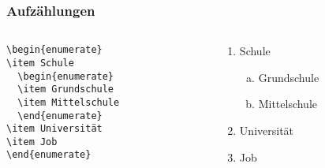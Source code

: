 \begin{frame}[fragile]
  \frametitle{Aufzählungen}

  \begin{Beispiel}
    \begin{columns}
      \begin{column}{0.4\linewidth}
\begin{lstlisting}
\begin{enumerate}
\item Schule
  \begin{enumerate}
  \item Grundschule
  \item Mittelschule
  \end{enumerate}
\item Universität
\item Job
\end{enumerate}
\end{lstlisting}
      \end{column}
      \begin{column}{0.4\linewidth}
        \begin{enumerate}[1. ]
        \item Schule
          \begin{enumerate}[a. ]
          \item Grundschule
          \item Mittelschule
          \end{enumerate}
        \item Universität
        \item Job
        \end{enumerate}
      \end{column}
    \end{columns}
  \end{Beispiel}

\end{frame}

